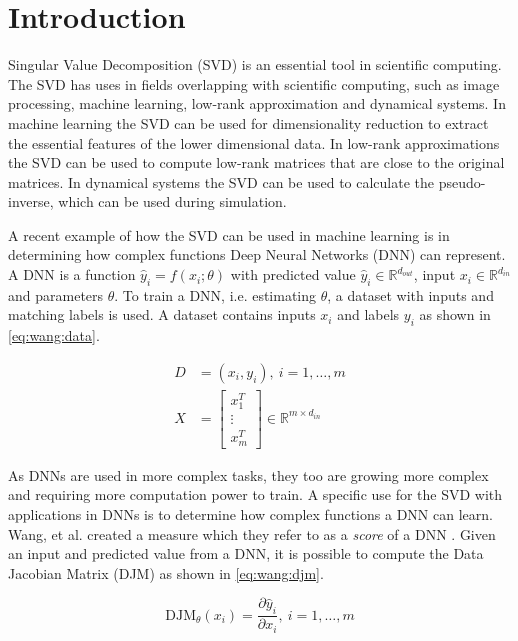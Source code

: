 \chapter {Introduction}

Singular Value Decomposition (SVD) is an essential tool in scientific computing. The SVD has uses in fields overlapping with scientific computing, such as image processing, machine learning, low-rank approximation and dynamical systems. In machine learning the SVD can be used for dimensionality reduction to extract the essential features of the lower dimensional data. In low-rank approximations the SVD can be used to compute low-rank matrices that are close to the original matrices. In dynamical systems the SVD can be used to calculate the pseudo-inverse, which can be used during simulation.

A recent example of how the SVD can be used in machine learning is in determining how complex functions Deep Neural Networks (DNN) can represent. A DNN is a function $\hat y_i = f(x_i; \theta)$ with predicted value $\hat y_i \in \mathbb{R}^{d_{out}}$, input $x_i \in \mathbb{R}^{d_{in}}$ and parameters $\theta$. To train a DNN, i.e. estimating $\theta$, a dataset with inputs and matching labels is used. A dataset contains inputs $x_i$ and labels $y_i$ as shown in \eqref{eq:wang:data}.

\begin{equation} \label{eq:wang:data}
  \begin{split}
    D &= {(x_i,y_i)},\ i=1,\dotsc,m \\
    X &=
    \begin{bmatrix}
      x_1^T \\
      \vdots \\
      x_m^T
    \end{bmatrix} \in \mathbb{R}^{m \times d_{in}}
  \end{split}
\end{equation}

As DNNs are used in more complex tasks, they too are growing more complex and requiring more computation power to train. A specific use for the SVD with applications in DNNs is to determine how complex functions a DNN can learn. Wang, et al. created a measure which they refer to as a \textit{score} of a DNN \cite{icml16:wang:edjm}. Given an input and predicted value from a DNN, it is possible to compute the Data Jacobian Matrix (DJM) \cite{icml16:wang:edjm} as shown in \eqref{eq:wang:djm}.

\begin{equation} \label{eq:wang:djm}
    \mathrm{DJM}_{\theta}(x_i) = \frac{\partial \hat y_i}{\partial x_i},\ i=1, \dots, m
\end{equation}

